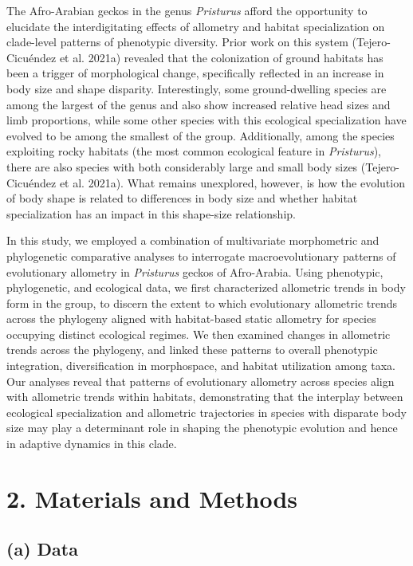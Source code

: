 \documentclass[
  11pt,
]{article}
\begin{document}
The Afro-Arabian geckos in the genus \emph{Pristurus} afford the
opportunity to elucidate the interdigitating effects of allometry and
habitat specialization on clade-level patterns of phenotypic diversity.
Prior work on this system (Tejero-Cicuéndez et al. 2021a) revealed that
the colonization of ground habitats has been a trigger of morphological
change, specifically reflected in an increase in body size and shape
disparity. Interestingly, some ground-dwelling species are among the
largest of the genus and also show increased relative head sizes and
limb proportions, while some other species with this ecological
specialization have evolved to be among the smallest of the group.
Additionally, among the species exploiting rocky habitats (the most
common ecological feature in \emph{Pristurus}), there are also species
with both considerably large and small body sizes (Tejero-Cicuéndez et
al. 2021a). What remains unexplored, however, is how the evolution of
body shape is related to differences in body size and whether habitat
specialization has an impact in this shape-size relationship.
\hfill\break

In this study, we employed a combination of multivariate morphometric
and phylogenetic comparative analyses to interrogate macroevolutionary
patterns of evolutionary allometry in \emph{Pristurus} geckos of
Afro-Arabia. Using phenotypic, phylogenetic, and ecological data, we
first characterized allometric trends in body form in the group, to
discern the extent to which evolutionary allometric trends across the
phylogeny aligned with habitat-based static allometry for species
occupying distinct ecological regimes. We then examined changes in
allometric trends across the phylogeny, and linked these patterns to
overall phenotypic integration, diversification in morphospace, and
habitat utilization among taxa. Our analyses reveal that patterns of
evolutionary allometry across species align with allometric trends
within habitats, demonstrating that the interplay between ecological
specialization and allometric trajectories in species with disparate
body size may play a determinant role in shaping the phenotypic
evolution and hence in adaptive dynamics in this clade.

\hypertarget{materials-and-methods}{%
\section{2. Materials and Methods}\label{materials-and-methods}}

\hypertarget{a-data}{%
\subsection{(a) Data}\label{a-data}}
\end{document}
